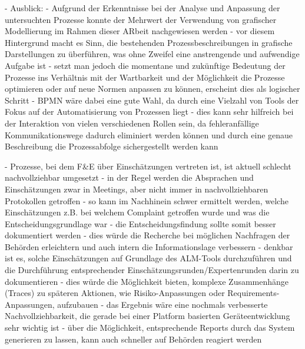 \documentclass[a4paper,12pt]{report}
\begin{document}
- Ausblick:
- Aufgrund der Erkenntnisse bei der Analyse und Anpassung der untersuchten Prozesse konnte der Mehrwert der Verwendung von grafischer Modellierung im Rahmen dieser ARbeit nachgewiesen werden
- vor diesem Hintergrund macht es Sinn, die bestehenden Prozessbeschreibungen in grafische Darstellungen zu überführen, was ohne Zweifel eine anstrengende und aufwendige Aufgabe ist
- setzt man jedoch die momentane und zukünftige Bedeutung der Prozesse ins Verhältnis mit der Wartbarkeit und der Möglichkeit die Prozesse optimieren oder auf neue Normen anpassen zu können, erscheint dies als logischer Schritt
- BPMN wäre dabei eine gute Wahl, da durch eine Vielzahl von Tools der Fokus auf der Automatisierung von Prozessen liegt
- dies kann sehr hilfreich bei der Interaktion von vielen verschiedenen Rollen sein, da fehleranfällige Kommunikationswege dadurch eliminiert werden können und durch eine genaue Beschreibung die Prozessabfolge sichergestellt werden kann

  - Prozesse, bei dem F\&E über Einschätzungen vertreten ist, ist aktuell schlecht nachvollziehbar umgesetzt
  - in der Regel werden die Absprachen und Einschätzungen zwar in Meetings, aber nicht immer in nachvollziehbaren Protokollen getroffen
  - so kann im Nachhinein schwer ermittelt werden, welche Einschätzungen z.B. bei welchem Complaint getroffen wurde und was die Entscheidungsgrundlage war
  - die Entscheidungsfindung sollte somit besser dokumentiert werden
  - dies würde die Recherche bei möglichen Nachfragen der Behörden erleichtern und auch intern die Informationslage verbessern
  - denkbar ist es, solche Einschätzungen auf Grundlage des ALM-Tools durchzuführen und die Durchführung entsprechender Einschätzungsrunden/Expertenrunden darin zu dokumentieren
  - dies würde die Möglichkeit bieten, komplexe Zusammenhänge (Traces) zu späteren Aktionen, wie Risiko-Anpassungen oder Requirements-Anpassungen, aufzubauen
  - das Ergebnis wäre eine nochmals verbesserte Nachvollziehbarkeit, die gerade bei einer Platform basierten Geräteentwicklung sehr wichtig ist
  - über die Möglichkeit, entsprechende Reports durch das System generieren zu lassen, kann auch schneller auf Behörden reagiert werden
  
\end{document}

